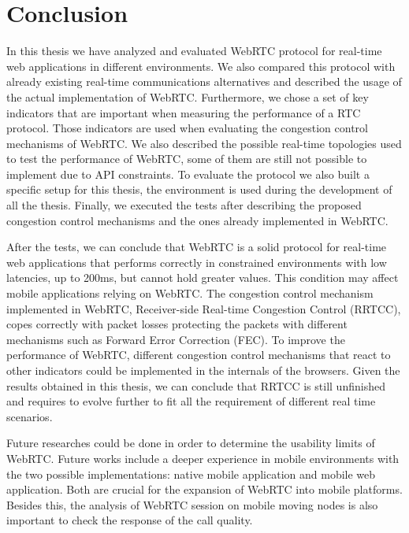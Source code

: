 \section{Conclusion}

\thispagestyle{empty}

In this thesis we have analyzed and evaluated WebRTC protocol for real-time web applications in different environments. We also compared this protocol with already existing real-time communications alternatives and described the usage of the actual implementation of WebRTC. Furthermore, we chose a set of key indicators that are important when measuring the performance of a RTC protocol. Those indicators are used when evaluating the congestion control mechanisms of WebRTC. We also described the possible real-time topologies used to test the performance of WebRTC, some of them are still not possible to implement due to API constraints. To evaluate the protocol we also built a specific setup for this thesis, the environment is used during the development of all the thesis. Finally, we executed the tests after describing the proposed congestion control mechanisms and the ones already implemented in WebRTC.

After the tests, we can conclude that WebRTC is a solid protocol for real-time web applications that performs correctly in constrained environments with low latencies, up to 200ms, but cannot hold greater values. This condition may affect mobile applications relying on WebRTC. The congestion control mechanism implemented in WebRTC, Receiver-side Real-time Congestion Control (RRTCC), copes correctly with packet losses protecting the packets with different mechanisms such as Forward Error Correction (FEC). To improve the performance of WebRTC, different congestion control mechanisms that react to other indicators could be implemented in the internals of the browsers. Given the results obtained in this thesis, we can conclude that RRTCC is still unfinished and requires to evolve further to fit all the requirement of different real time scenarios.

Future researches could be done in order to determine the usability limits of WebRTC. Future works include a deeper experience in mobile environments with the two possible implementations: native mobile application and mobile web application. Both are crucial for the expansion of WebRTC into mobile platforms. Besides this, the analysis of WebRTC session on mobile moving nodes is also important to check the response of the call quality.

